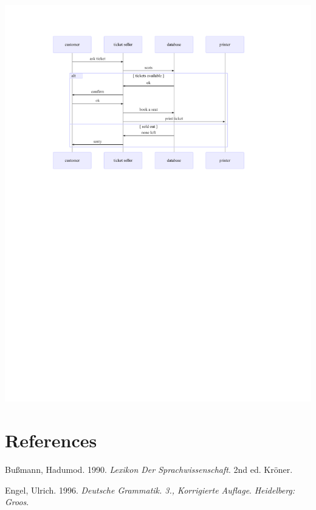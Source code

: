 \documentclass[
  letterpaper,
]{scrbook}
\newlength{\cslhangindent}
\newlength{\cslentryspacingunit} %
\newenvironment{CSLReferences}[2] %
 {%
  \setlength{\parindent}{0pt}
  \ifodd #1
  \let\oldpar\par
  \def\par{\hangindent=\cslhangindent\oldpar}
  \fi
  \setlength{\parskip}{#2\cslentryspacingunit}
 }%
 {}
\begin{document}
\includegraphics{./summary_files/figure-pdf/unnamed-chunk-5-1.pdf}


\hypertarget{references}{%
\chapter*{References}\label{references}}

\hypertarget{refs}{}
\begin{CSLReferences}{1}{0}
\leavevmode{}%
Bußmann, Hadumod. 1990. \emph{Lexikon Der Sprachwissenschaft}. 2nd ed.
Kr{ö}ner.

\leavevmode{}%
Engel, Ulrich. 1996. \emph{Deutsche Grammatik. 3., Korrigierte Auflage}.
\emph{Heidelberg: Groos}.

\end{CSLReferences}


\backmatter

\printindex
\end{document}
